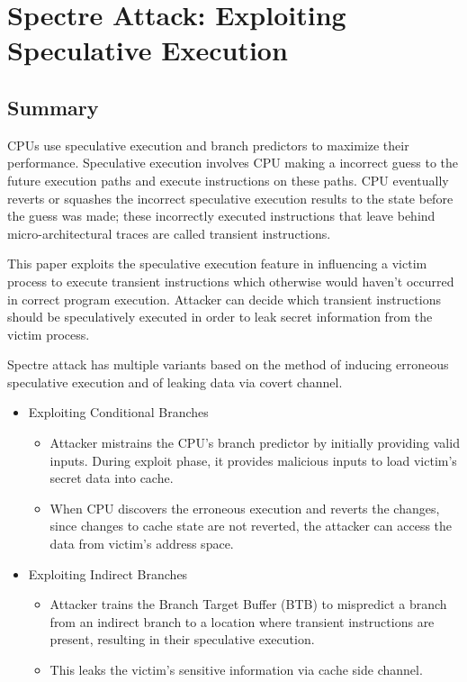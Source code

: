 \documentclass[a4paper,12pt, final]{report}
\begin{document}
\section{Spectre Attack: Exploiting Speculative Execution}

\subsection{Summary}
CPUs use speculative execution and branch predictors to maximize their performance. Speculative execution involves CPU making a incorrect guess to the future execution paths and execute instructions on these paths. CPU eventually reverts or squashes the incorrect speculative execution results to the state before the guess was made; these incorrectly executed instructions that leave behind micro-architectural traces are called transient instructions.

This paper \cite{spectre} exploits the speculative execution feature in influencing a victim process to execute transient instructions which otherwise would haven't occurred in correct program execution. Attacker can decide which transient instructions should be speculatively executed in order to leak secret information from the victim process.

Spectre attack has multiple variants based on the method of inducing erroneous speculative execution and of leaking data via covert channel.
\begin{itemize}
    \item Exploiting Conditional Branches
    \begin{itemize}
        \item Attacker mistrains the CPU's branch predictor by initially providing valid inputs. During exploit phase, it provides malicious inputs to load victim's secret data into cache.
        \item When CPU discovers the erroneous execution and reverts the changes, since changes to cache state are not reverted, the attacker can access the data from victim's address space.
    \end{itemize}
    
    \item Exploiting Indirect Branches
    \begin{itemize}
        \item Attacker trains the Branch Target Buffer (BTB) to mispredict a branch from an indirect branch to a location where transient instructions are present, resulting in their speculative execution.
        \item This leaks the victim's sensitive information via cache side channel.
    \end{itemize}
\end{itemize}
\end{document}

